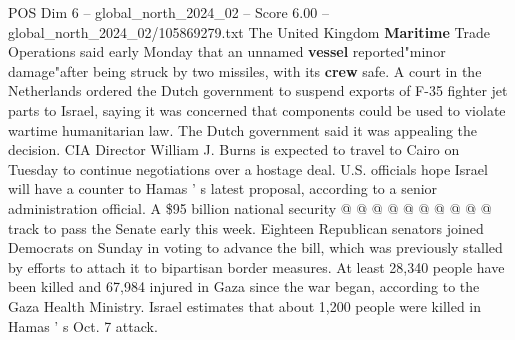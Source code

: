 \begin{textsample}{POS Dim 6 – global\_north\_2024\_02 – Score 6.00 – global\_north\_2024\_02/105869279.txt}
The United Kingdom \textbf{Maritime} Trade Operations said early Monday that an unnamed \textbf{vessel} reported"minor damage"after being struck by two missiles, with its \textbf{crew} safe.
A court in the Netherlands ordered the Dutch government to suspend exports of F-35 fighter jet parts to Israel, saying it was concerned that components could be used to violate wartime humanitarian law.
The Dutch government said it was appealing the decision.
CIA Director William J.
Burns is expected to travel to Cairo on Tuesday to continue negotiations over a hostage deal.
U.S. officials hope Israel will have a counter to Hamas ' s latest proposal, according to a senior administration official.
A \$95 billion national security @ @ @ @ @ @ @ @ @ @ track to pass the Senate early this week.
Eighteen Republican senators joined Democrats on Sunday in voting to advance the bill, which was previously stalled by efforts to attach it to bipartisan border measures.
At least 28,340 people have been killed and 67,984 injured in Gaza since the war began, according to the Gaza Health Ministry.
Israel estimates that about 1,200 people were killed in Hamas ' s Oct. 7 attack.

\end{textsample}
